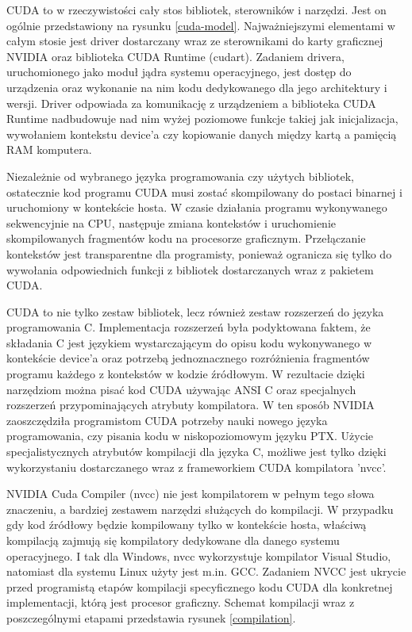 CUDA to w rzeczywistości cały stos bibliotek, sterowników i narzędzi. Jest on
ogólnie 
przedstawiony na rysunku \ref{cuda-model}. Najważniejszymi elementami w całym
stosie jest driver dostarczany wraz ze sterownikami do karty graficznej NVIDIA 
oraz biblioteka CUDA Runtime (cudart). Zadaniem drivera, uruchomionego
jako moduł jądra systemu operacyjnego, jest dostęp do urządzenia oraz wykonanie
na nim kodu dedykowanego dla jego architektury i wersji. Driver odpowiada za
komunikację z urządzeniem a biblioteka CUDA Runtime nadbudowuje nad nim wyżej
poziomowe funkcje takiej jak inicjalizacja, wywołaniem kontekstu device'a czy
kopiowanie danych między kartą a pamięcią RAM komputera.

Niezależnie od wybranego języka programowania czy użytych bibliotek, ostatecznie kod programu CUDA musi
zostać skompilowany do postaci binarnej i uruchomiony w kontekście hosta. W
czasie działania programu wykonywanego sekwencyjnie na CPU, następuje zmiana
kontekstów i uruchomienie skompilowanych fragmentów kodu na procesorze graficznym.
Przełączanie kontekstów jest transparentne dla programisty,
ponieważ ogranicza się tylko do wywołania odpowiednich funkcji z bibliotek
dostarczanych wraz z pakietem CUDA.

CUDA to nie tylko zestaw bibliotek, lecz również zestaw rozszerzeń do języka
programowania C. Implementacja rozszerzeń była
podyktowana faktem, że składania C jest językiem wystarczającym do opisu kodu
wykonywanego w kontekście device'a oraz potrzebą jednoznacznego rozróżnienia
fragmentów programu każdego z kontekstów w kodzie źródłowym. W rezultacie
dzięki narzędziom można pisać kod CUDA używając ANSI C oraz specjalnych rozszerzeń
przypominających atrybuty kompilatora. W ten sposób NVIDIA
zaoszczędziła programistom CUDA potrzeby nauki nowego języka programowania, czy
pisania kodu w niskopoziomowym języku PTX. Użycie specjalistycznych atrybutów
kompilacji dla języka C, możliwe jest tylko dzięki wykorzystaniu dostarczanego wraz z
frameworkiem CUDA kompilatora 'nvcc'.

NVIDIA Cuda Compiler (nvcc) nie jest kompilatorem w pełnym tego słowa
znaczeniu, a bardziej zestawem narzędzi służących do kompilacji. W przypadku gdy
kod źródłowy będzie kompilowany tylko w kontekście hosta, właściwą kompilacją
zajmują się kompilatory dedykowane dla danego systemu operacyjnego. I tak dla
Windows, nvcc wykorzystuje kompilator Visual Studio, natomiast dla systemu Linux
użyty jest m.in. GCC. Zadaniem NVCC jest ukrycie przed programistą etapów kompilacji
specyficznego kodu CUDA dla konkretnej implementacji, którą jest procesor
graficzny. Schemat kompilacji wraz z poszczególnymi etapami przedstawia rysunek
\ref{compilation}.

